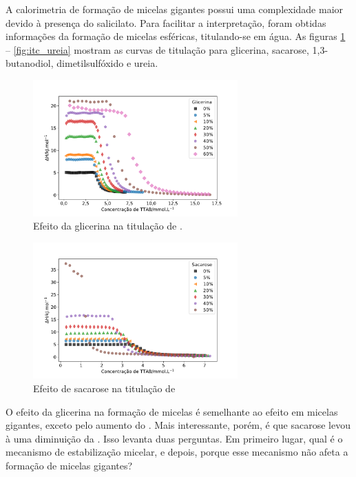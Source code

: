 		A calorimetria de formação de micelas gigantes possui uma complexidade maior devido à presença do salicilato. Para facilitar a interpretação, foram obtidas informações da formação de micelas esféricas, titulando-se \TTAB{} em água. As figuras \ref{fig:itc_glicerina} -- \ref{fig:itc_ureia} mostram as curvas de titulação para glicerina, sacarose, 1,3-butanodiol, dimetilsulfóxido e ureia.
					
			
			\begin{figure}[h]
				\centering
				\includegraphics[width=0.7\textwidth]{imagens/itc/ITC_glic}
				\caption{Efeito da glicerina na titulação de \TTAB.}
				\label{fig:itc_glicerina}
			\end{figure}
		
			\begin{figure}[h]
				\centering
				\includegraphics[width=0.7\textwidth]{imagens/itc/ITC_sac}
				\caption{Efeito de sacarose na titulação de \TTAB}
				\label{fig:itc_sacarose}
			\end{figure}
			
			O efeito da glicerina na formação de micelas é semelhante ao efeito em micelas gigantes, exceto pelo aumento do \DHmic{}. Mais interessante, porém, é que sacarose levou à uma diminuição da \cmc{}. Isso levanta duas perguntas. Em primeiro lugar, qual é o mecanismo de estabilização micelar, e depois, porque esse mecanismo não afeta a formação de micelas gigantes?
			
